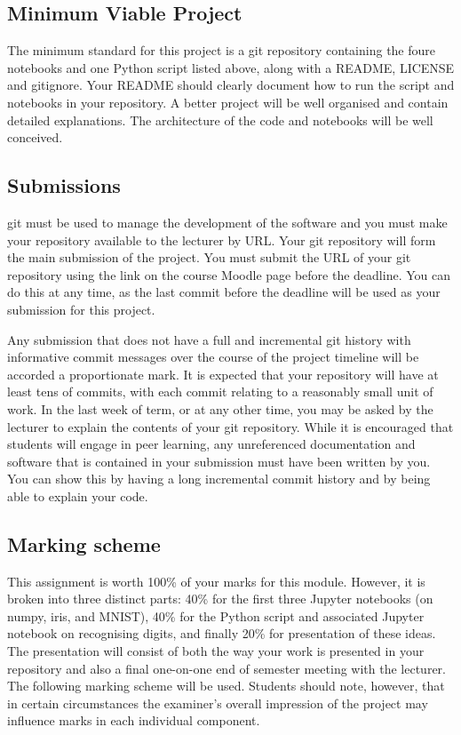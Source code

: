 \documentclass[12pt, a4paper]{article}
\begin{document}
\subsection*{Minimum Viable Project}
The minimum standard for this project is a git repository containing the foure notebooks and one Python script listed above, along with a README, LICENSE and gitignore.
Your README should clearly document how to run the script and notebooks in your repository.
A better project will be well organised and contain detailed explanations.
The architecture of the code and notebooks will be well conceived.


\subsection*{Submissions}
git must be used to manage the development of the software and you must make your repository available to the lecturer by URL.
Your git repository will form the main submission of the project.
You must submit the URL of your git repository using the link on the course Moodle page before the deadline.
You can do this at any time, as the last commit before the deadline will be used as your submission for this project.

Any submission that does not have a full and incremental git history with informative commit messages over the course of the project timeline will be accorded a proportionate mark.
It is expected that your repository will have at least tens of commits, with each commit relating to a reasonably small unit of work.
In the last week of term, or at any other time, you may be asked by the lecturer to explain the contents of your git repository.
While it is encouraged that students will engage in peer learning, any unreferenced documentation and software that is contained in your submission must have been written by you.
You can show this by having a long incremental commit history and by being able to explain your code.

\subsection*{Marking scheme}
This assignment is worth 100\% of your marks for this module.
However, it is broken into three distinct parts: 40\% for the first three Jupyter notebooks (on numpy, iris, and MNIST), 40\% for the Python script and associated Jupyter notebook on recognising digits, and finally 20\% for presentation of these ideas.
The presentation will consist of both the way your work is presented in your repository and also a final one-on-one end of semester meeting with the lecturer.
The following marking scheme will be used.
Students should note, however, that in certain circumstances the examiner's overall impression of the project may influence marks in each individual component.
\end{document}
